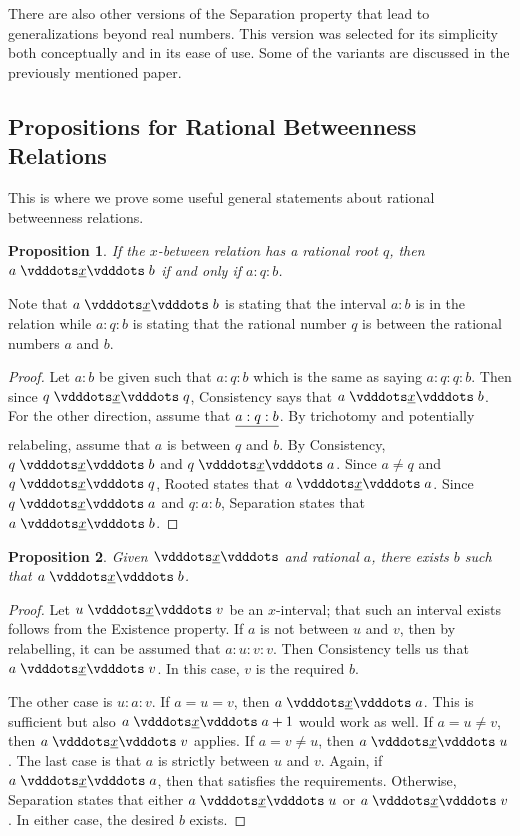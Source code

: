 \documentclass[12pt]{article}
\newtheorem{proposition}{Proposition}[section]
\begin{document}
There are also other versions of the Separation property that lead to generalizations beyond real numbers. This version was selected for its simplicity both conceptually and in its ease of use. Some of the variants are discussed in the previously mentioned paper. 

\subsection{Propositions for Rational Betweenness Relations}

This is where we prove some useful general statements about rational betweenness relations. 

\begin{proposition}\label{br:rooted}
    If the $x$-between relation has a rational root $q$, then $a \xrel b$ if and only if $a : q : b$.
\end{proposition}

Note that $a \xrel b$ is stating that the interval $a:b$ is in the relation while $a:q:b$ is stating that the rational number $q$ is between the rational numbers $a$ and $b$.

\begin{proof}
    Let $a : b$ be given such that $a : q : b$ which is the same as saying $a:q:q:b$. Then since $q \xrel q$, Consistency says that $a \xrel b$. For the other direction, assume that $\sout{a:q:b}$. By trichotomy and potentially relabeling, assume that $a$ is between $q$ and $b$. By Consistency, $q \xrel b$ and $q\xrel a$.  Since $a \neq q$ and $q \xrel q$, Rooted states that \sout{$a \xrel a$}. Since $q \xrel a$ and $q:a:b$, Separation states that \sout{$ a \xrel b$}. 
\end{proof}


\begin{proposition}\label{br:existence}
    Given $\xrel$ and rational $a$, there exists $b$ such that $a \xrel b$. 
\end{proposition}

\begin{proof}
    Let $u \xrel v$ be an $x$-interval; that such an interval exists follows from the Existence property. If $a$ is not between $u$ and $v$, then by relabelling, it can be assumed that $a:u:v:v$. Then Consistency tells us that $a \xrel v$. In this case, $v$ is the required $b$. 

    The other case is $u:a:v$. If $a = u = v$, then $a \xrel a$. This is sufficient but also $a \xrel a+1$ would work as well. If $a = u \neq v$, then $a \xrel v$ applies. If $a  = v \neq u$, then $a \xrel u$. The last case is that $a$ is strictly between $u$ and $v$. Again, if $a \xrel a$, then that satisfies the requirements. Otherwise, Separation states that either $a \xrel u$ or $a \xrel v$. In either case, the desired $b$ exists. 
\end{proof}
\end{document}
